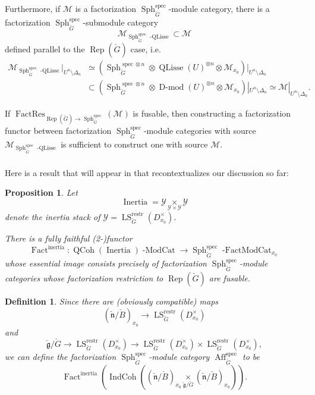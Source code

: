 \documentclass[10pt,a4paper]{amsart}
\newtheorem{prop}[subsubsection]{Proposition}
\newtheorem{defn}[subsubsection]{Definition}
\newcommand{\on}[1]{\operatorname{#1}}
\newcommand{\Dmod}{\on{D-mod}}
\newcommand{\Gcheck}{\check{G}}
\newcommand{\gcheck}{\check{\mathfrak{g}}}
\newcommand{\ncheck}{\check{\mathfrak{n}}}
\newcommand{\Bcheck}{\check{B}}
\newcommand{\sssec}[1]{\subsubsection{}}
\begin{document}
\sssec{}
Furthermore, if $\mathcal{M}$ is a factorization $\on{Sph}_{\Gcheck}^{\on{spec}}$-module category, there is a factorization $\on{Sph}_{\Gcheck}^{\on{spec}}$-submodule category
$$
\mathcal{M}_{\on{Sph}_{\Gcheck}^{\on{spec}}\on{-QLisse}} \subset \mathcal{M}
$$
defined parallel to the $\on{Rep}(\Gcheck)$ case, i.e.
\begin{align}
\mathcal{M}_{\on{Sph}_{\Gcheck}^{\on{spec}}\on{-QLisse}}|_{U^n \setminus \Delta_n} &\simeq (\on{Sph}_{\Gcheck}^{\on{spec} \otimes n} \otimes \on{QLisse}(U)^{\otimes n} \otimes \mathcal{M}_{x_0})|_{U^n \setminus \Delta_n} \\
&\subset (\on{Sph}_{\Gcheck}^{\on{spec} \otimes n} \otimes \Dmod(U)^{\otimes n} \otimes \mathcal{M}_{x_0})|_{U^n \setminus \Delta_n} \simeq \mathcal{M}|_{U^n \setminus \Delta_n}.
\end{align}

If $\on{FactRes}_{\on{Rep}(\Gcheck) \to \on{Sph}_{\Gcheck}^{\on{spec}}}(\mathcal{M})$ is fusable, then constructing a factorization functor between factorization $\on{Sph}_{\Gcheck}^{\on{spec}}$-module categories with source $\mathcal{M}_{\on{Sph}_{\Gcheck}^{\on{spec}}\on{-QLisse}}$ is sufficient to construct one with source $\mathcal{M}$.

\sssec{}
Here is a result that will appear in \cite{BCG} that recontextualizes our discussion so far:

\begin{prop}
    Let
    $$
    \on{Inertia} = \mathcal{Y} \underset{\mathcal{Y} \times \mathcal{Y}}{\times} \mathcal{Y}
    $$
    denote the inertia stack of $\mathcal{Y} = \on{LS}_{\Gcheck}^{\on{restr}}(D_{x_0}^{\times})$.
    
    There is a fully faithful (2-)functor
    $$
    \on{Fact}^{\on{inertia}} : \on{QCoh}(\on{Inertia})\on{-ModCat} \longrightarrow \on{Sph}_{\Gcheck}^{\on{spec}}\on{-FactModCat}_{x_0}
    $$
    whose essential image consists precisely of factorization $\on{Sph}_{\Gcheck}^{\on{spec}}$-module categories whose factorization restriction to $\on{Rep}(\Gcheck)$ are fusable.
\end{prop}

\begin{defn}
    Since there are (obviously compatible) maps
    $$
    (\ncheck/\Bcheck)_{x_0} \longrightarrow \on{LS}_{\Gcheck}^{\on{restr}}(D_{x_0}^{\times})
    $$
    and
    $$
    \gcheck/\Gcheck \longrightarrow \on{LS}_{\Gcheck}^{\on{restr}}(D_{x_0}^{\times}) \longrightarrow \on{LS}_{\Gcheck}^{\on{restr}}(D_{x_0}^{\times}) \times \on{LS}_{\Gcheck}^{\on{restr}}(D_{x_0}^{\times}),
    $$
    we can define the factorization $\on{Sph}_{\Gcheck}^{\on{spec}}$-module category $\on{Aff}_{\Gcheck}^{\on{spec}}$ to be
    $$
    \on{Fact}^{\on{inertia}}(\on{IndCoh}((\ncheck/\Bcheck)_{x_0} \underset{\gcheck/\Gcheck}{\times} (\ncheck/\Bcheck)_{x_0})).
    $$
\end{defn}
\end{document}
